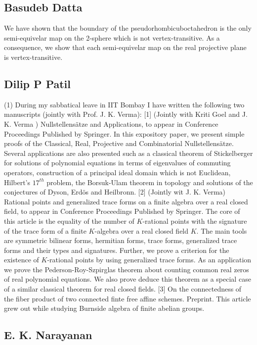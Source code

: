 \subsection{Basudeb Datta}

We have shown that the boundary of the pseudorhombicuboctahedron is the only semi-equivelar map on the 2-sphere which is not vertex-transitive.   As a consequence, we show that each semi-equivelar map on the real projective plane is vertex-transitive.


\subsection{Dilip P Patil}

(1) During my sabbatical leave in IIT Bombay I have written the following two manuscripts (jointly with Prof. J. K. Verma):  [1] (Jointly with Kriti Goel and J. K. Verma ) Nullstellens\"atze and Applications, to appear in Conference Proceedings Published by Springer.   In this expository paper, we present simple proofs of the Classical, Real, Projective  and Combinatorial Nullstellens\"atze. Several applications are also presented such as a classical theorem of Stickelberger for solutions of polynomial equations in terms of eigenvalues of commuting operators, construction of a principal ideal domain which is not Euclidean, Hilbert's $17^{th}$ problem,  the Borsuk-Ulam theorem in topology and solutions of the conjectures of Dyson, Erd\"{o}s and Heilbronn.  [2]  (Jointly wit  J. K. Verma) Rational points and generalized trace forms on a finite algebra over a real closed field, to appear in Conference Proceedings Published by Springer.   The core of this article is the equality of the number of $K$-rational points  with the signature of the trace form of a finite $K$-algebra over a real closed field $K$. The main tools are symmetric bilinear forms, hermitian forms, trace forms, generalized trace forms and their types and signatures.  Further, we prove a criterion for the existence of $K$-rational points by using generalized trace forms. As an application we prove the Pederson-Roy-Szpirglas theorem  about counting common real zeros of  real polynomial equations. We also prove deduce this theorem as a special case of a similar classical theorem for real closed fields.  [3] On the connectedness of the fiber product of two connected finte free affine schemes. Preprint.  This article grew out while studying Burnside algebra of finite abelian groups.             


\subsection{E. K. Narayanan}

